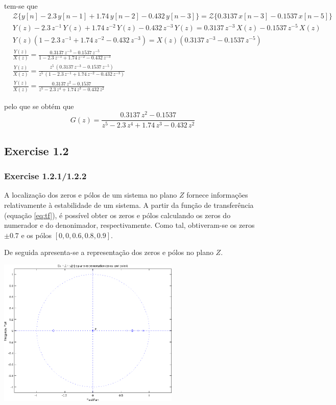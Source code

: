 \documentclass[a4paper]{article}
\begin{document}
\noindent tem-se que
\begin{eqnarray}
	&\mathcal{Z}\{y[n] - 2.3 \, y[n - 1] + 1.74 \, y[n - 2] - 0.432 \, y[n - 3]\} = \mathcal{Z}\{0.3137 \, x[n - 3] - 0.1537 \, x[n - 5]\} \\
	&Y(z) - 2.3 \, z^{-1} \, Y(z) + 1.74 \, z^{-2} \, Y(z) - 0.432 \, z^{-3} \, Y(z) = 0.3137 \, z^{-3} \, X(z) - 0.1537 \, z^{-5} \, X(z) \\
	&Y(z) (1 - 2.3 \, z^{-1} + 1.74 \, z^{-2} - 0.432 \, z^{-3}) = X(z)(0.3137 \, z^{-3} - 0.1537 \, z^{-5}) \\
	&\frac{Y(z)}{X(z)} = \frac{0.3137 \, z^{-3} - 0.1537 \, z^{-5}}{1 - 2.3 \, z^{-1} + 1.74 \, z^{-2} - 0.432 \, z^{-3}} \\
	&\frac{Y(z)}{X(z)} = \frac{z^{5} \, (0.3137 \, z^{-3} - 0.1537 \, z^{-5})}{z^{5} \, (1 - 2.3 \, z^{-1} + 1.74 \, z^{-2} - 0.432 \, z^{-3})} \\
	&\frac{Y(z)}{X(z)} = \frac{0.3137 \, z^{2} - 0.1537}{z^{5} - 2.3 \, z^{4} + 1.74 \, z^{3} - 0.432 \, z^{2}}
\end{eqnarray}

\noindent pelo que se obtém que
\begin{equation}
	\label{eq:tf}
	G(z) = \frac{0.3137 \, z^{2} - 0.1537}{z^{5} - 2.3 \, z^{4} + 1.74 \, z^{3} - 0.432 \, z^{2}}
\end{equation}

\clearpage
\subsection{Exercise 1.2}
\subsubsection{Exercise 1.2.1/1.2.2}
\noindent A localização dos zeros e pólos de um sistema no plano $Z$ fornece informações relativamente à estabilidade de um sistema. A partir da função de transferência (equação \ref{eq:tf}), é possível obter os zeros e pólos calculando os zeros do numerador e do denonimador, respectivamente. Como tal, obtiveram-se os zeros $\pm 0.7$ e os pólos $[0, 0, 0.6, 0.8, 0.9]$.

\noindent De seguida apresenta-se a representação dos zeros e pólos no plano $Z$.
\begin{center}
	\includegraphics[width=0.65\textwidth]{images/ex1_2_1.png}
	\label{fig:ex1_2_1_zplane}
\end{center}
\end{document}
